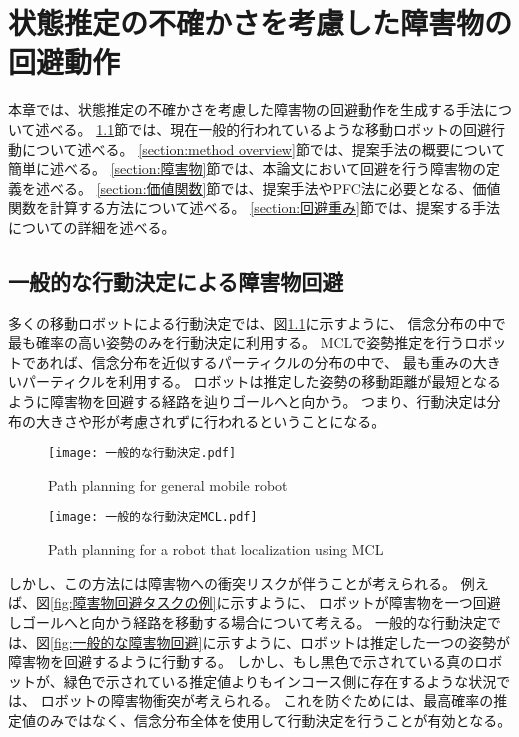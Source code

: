 \chapter{状態推定の不確かさを考慮した障害物の回避動作} \label{chapter:method}
本章では、状態推定の不確かさを考慮した障害物の回避動作を生成する手法について述べる。
\ref{section:一般的な回避}節では、現在一般的行われているような移動ロボットの回避行動について述べる。
\ref{section:method overview}節では、提案手法の概要について簡単に述べる。
\ref{section:障害物}節では、本論文において回避を行う障害物の定義を述べる。
\ref{section:価値関数}節では、提案手法やPFC法に必要となる、価値関数を計算する方法について述べる。
\ref{section:回避重み}節では、提案する手法についての詳細を述べる。


\section{一般的な行動決定による障害物回避} \label{section:一般的な回避}
多くの移動ロボットによる行動決定では、図\ref{fig:一般的な行動決定}に示すように、
信念分布の中で最も確率の高い姿勢のみを行動決定に利用する。
MCLで姿勢推定を行うロボットであれば、信念分布を近似するパーティクルの分布の中で、
最も重みの大きいパーティクルを利用する。
ロボットは推定した姿勢の移動距離が最短となるように障害物を回避する経路を辿りゴールへと向かう。
つまり、行動決定は分布の大きさや形が考慮されずに行われるということになる。

\begin{figure}[H]
  \begin{center}
    \texttt{[image: 一般的な行動決定.pdf]}
    \caption{Path planning for general mobile robot}
    \label{fig:一般的な行動決定}
  \end{center}
\end{figure}

\begin{figure}[H]
  \begin{center}
    \texttt{[image: 一般的な行動決定MCL.pdf]}
    \caption{Path planning for a robot that localization using MCL}
    \label{fig:一般的な行動決定MCL}
  \end{center}
\end{figure}

しかし、この方法には障害物への衝突リスクが伴うことが考えられる。
例えば、図\ref{fig:障害物回避タスクの例}に示すように、
ロボットが障害物を一つ回避しゴールへと向かう経路を移動する場合について考える。
一般的な行動決定では、図\ref{fig:一般的な障害物回避}に示すように、ロボットは推定した一つの姿勢が障害物を回避するように行動する。
しかし、もし黒色で示されている真のロボットが、緑色で示されている推定値よりもインコース側に存在するような状況では、
ロボットの障害物衝突が考えられる。
これを防ぐためには、最高確率の推定値のみではなく、信念分布全体を使用して行動決定を行うことが有効となる。

